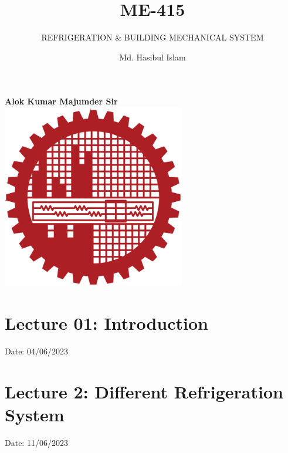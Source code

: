 \documentclass{article}
\title{ME-415}
\author{Md. Hasibul Islam}
\subtitle{REFRIGERATION \& BUILDING MECHANICAL SYSTEM}
\begin{document}
\begin{titlepage}
    \centering
    
    {\Huge\bfseries\maketitle}
    \textbf{Alok Kumar Majumder Sir} \\
    \vspace{2cm}
    \includegraphics[width=8cm]{institution_logo.jpg}
    \vfill
    \vspace*{2cm}
\end{titlepage}

\tableofcontents
\pagebreak
\section{Lecture 01: Introduction} 
\hfill Date: 04/06/2023 


\section{Lecture 2: Different Refrigeration System}
\hfill Date: 11/06/2023
\end{document}
